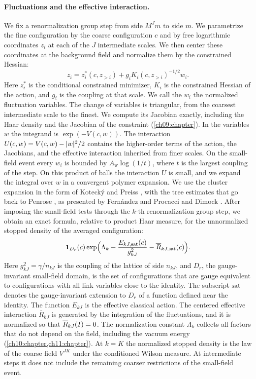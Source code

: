 \paragraph{Fluctuations and the effective interaction.}
We fix a renormalization group step from side $M^Jm$ to side $m$. We parametrize the fine configuration by the coarse configuration $c$ and by free logarithmic coordinates $z_i$ at each of the $J$ intermediate scales. We then center these coordinates at the background field and normalize them by the constrained Hessian:
\[
 z_i=z_i^*(c,z_{>i})+g_iK_i(c,z_{>i})^{-1/2}w_i.
\]
Here $z_i^*$ is the conditional constrained minimizer, $K_i$ is the constrained Hessian of the action, and $g_i$ is the coupling at that scale. We call the $w_i$ the normalized fluctuation variables. The change of variables is triangular, from the coarsest intermediate scale to the finest. We compute its Jacobian exactly, including the Haar density and the Jacobian of the constraint (\cref{ch09:chapter}). In the variables $w$ the integrand is $\exp(-V(c,w))$. The interaction $U(c,w)=V(c,w)-\lvert w\rvert^2/2$ contains the higher-order terms of the action, the Jacobians, and the effective interaction inherited from finer scales. On the small-field event every $w_i$ is bounded by $A_{\mathrm w}\log(1/t)$, where $t$ is the largest coupling of the step. On this product of balls the interaction $U$ is small, and we expand the integral over $w$ in a convergent polymer expansion. We use the cluster expansion in the form of Kotecký and Preiss \cite{KoteckyPreiss1986}, with the tree estimates that go back to Penrose \cite{Penrose1967}, as presented by Fern\'andez and Procacci \cite{FernandezProcacci2007} and Dimock \cite{Dimock2013v2}. After imposing the small-field tests through the $k$-th renormalization group step, we obtain an exact formula, relative to product Haar measure, for the unnormalized stopped density of the averaged configuration:
\begin{equation}\label{s3:eq:effective-density}
 \mathbf 1_{D_r}(c)\exp\Bigl(\Lambda_k-\frac{E_{kJ,\mathrm{sat}}(c)}{g_{kJ}^2}-\overline R_{kJ,\mathrm{sat}}(c)\Bigr).
\end{equation}
Here $g_{kJ}^2=\gamma/n_{kJ}$ is the coupling of the lattice of side $n_{kJ}$, and $D_r$, the gauge-invariant small-field domain, is the set of configurations that are gauge equivalent to configurations with all link variables close to the identity. The subscript $\mathrm{sat}$ denotes the gauge-invariant extension to $D_r$ of a function defined near the identity. The function $E_{kJ}$ is the effective classical action. The centered effective interaction $\overline R_{kJ}$ is generated by the integration of the fluctuations, and it is normalized so that $\overline R_{kJ}(I)=0$. The normalization constant $\Lambda_k$ collects all factors that do not depend on the field, including the vacuum energy (\cref{ch10:chapter,ch11:chapter}). At $k=K$ the normalized stopped density is the law of the coarse field $V^{JK}$ under the conditioned Wilson measure. At intermediate steps it does not include the remaining coarser restrictions of the small-field event.

